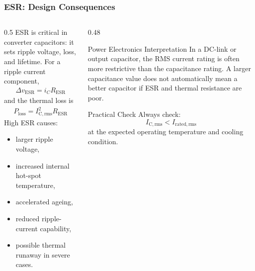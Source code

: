 \begin{frame}
\frametitle{ESR: Design Consequences}
\begin{columns}
\begin{column}{0.5\textwidth}
ESR is critical in converter capacitors: it sets ripple voltage, loss, and lifetime. For a ripple current component,
\begin{align}
    \Delta v_{\mathrm{ESR}}
    =
    i_C R_{\mathrm{ESR}}
\end{align}
and the thermal loss is
\begin{align}
    P_{\mathrm{loss}}
    =
    I_{\mathrm{C,rms}}^2R_{\mathrm{ESR}}
\end{align}
High ESR causes:
\begin{itemize}
    \item larger ripple voltage,
    \item increased internal hot-spot temperature,
    \item accelerated ageing,
    \item reduced ripple-current capability,
    \item possible thermal runaway in severe cases.
\end{itemize}
\end{column}

\begin{column}{0.48\textwidth}
\begin{block}{Power Electronics Interpretation}
\small
In a DC-link or output capacitor, the RMS current rating is often more restrictive than the capacitance rating. A larger capacitance value does not automatically mean a better capacitor if ESR and thermal resistance are poor.
\end{block}
\begin{block}{Practical Check}
\small
Always check:
\[
I_{\mathrm{C,rms}} < I_{\mathrm{rated,rms}}
\]
at the expected operating temperature and cooling condition.
\end{block}
\end{column}
\end{columns}

\end{frame}


